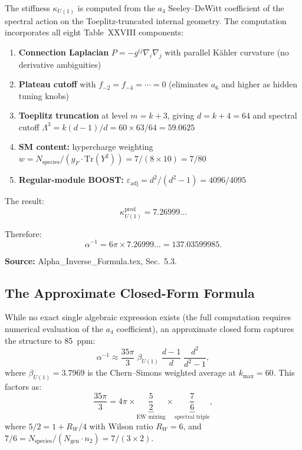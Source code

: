 \documentclass[12pt,a4paper]{article}
\begin{document}
The stiffness $\kappa_{U(1)}$ is computed from the $a_4$ Seeley--DeWitt
coefficient of the spectral action on the Toeplitz-truncated internal geometry.
The computation incorporates all eight Table~XXVIII components:

\begin{enumerate}
\item \textbf{Connection Laplacian} $P = -g^{ij}\nabla_i\nabla_j$ with parallel
  K\"ahler curvature (no derivative ambiguities)

\item \textbf{Plateau cutoff} with $f_{-2} = f_{-4} = \cdots = 0$ (eliminates
  $a_6$ and higher as hidden tuning knobs)

\item \textbf{Toeplitz truncation} at level $m = k+3$, giving $d = k+4 = 64$
  and spectral cutoff $\Lambda^3 = k(d-1)/d = 60 \times 63/64 = 59.0625$

\item \textbf{SM content:} hypercharge weighting
  $w = N_{\mathrm{species}}/(g_F \cdot \mathrm{Tr}(Y^2)) = 7/(8 \times 10)
  = 7/80$

\item \textbf{Regular-module BOOST:}
  $\varepsilon_{\mathrm{adj}} = d^2/(d^2-1) = 4096/4095$
\end{enumerate}

The result:
\begin{equation}
\kappa_{U(1)}^{\mathrm{pred}} = 7.26999\ldots
\end{equation}

Therefore:
\begin{equation}
\alpha^{-1} = 6\pi \times 7.26999\ldots = 137.03599985.
\end{equation}

\textbf{Source:} Alpha\_Inverse\_Formula.tex, Sec.~5.3.

\subsection{The Approximate Closed-Form Formula}

While no exact single algebraic expression exists (the full computation
requires numerical evaluation of the $a_4$ coefficient), an approximate
closed form captures the structure to 85~ppm:
\begin{equation}
\alpha^{-1} \approx \frac{35\pi}{3}\;\beta_{U(1)}\;\frac{d-1}{d}\;
\frac{d^2}{d^2-1},
\end{equation}
where $\beta_{U(1)} = 3.7969$ is the Chern--Simons weighted average at
$k_{\max} = 60$. This factors as:
\begin{equation}
\frac{35\pi}{3} = 4\pi \times \underbrace{\frac{5}{2}}_{\text{EW mixing}}
\times \underbrace{\frac{7}{6}}_{\text{spectral triple}},
\end{equation}
where $5/2 = 1 + R_W/4$ with Wilson ratio $R_W = 6$, and
$7/6 = N_{\mathrm{species}}/(N_{\mathrm{gen}} \cdot n_2) = 7/(3 \times 2)$.
\end{document}
